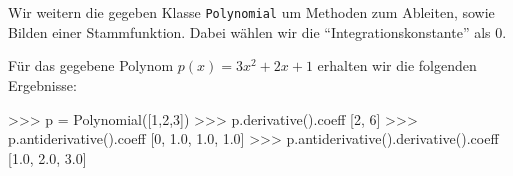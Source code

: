 \section{}

Wir weitern die gegeben Klasse \texttt{Polynomial} um Methoden zum Ableiten, sowie Bilden einer Stammfunktion.
Dabei wählen wir die \enquote{Integrationskonstante} als $0$.



%         
%     
%     
%     
%     

Für das gegebene Polynom $p(x) = 3 x^2 + 2 x + 1$ erhalten wir die folgenden Ergebnisse:

\begin{consoleoutput}
    >>> p = Polynomial([1,2,3])
    >>> p.derivative().coeff
    [2, 6]
    >>> p.antiderivative().coeff
    [0, 1.0, 1.0, 1.0]
    >>> p.antiderivative().derivative().coeff
    [1.0, 2.0, 3.0]
\end{consoleoutput}




